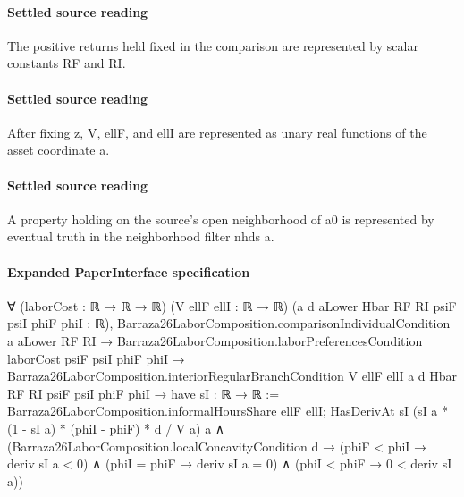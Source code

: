 \documentclass[10pt]{article}
\begin{document}
\paragraph{Settled source reading}
\begin{sloppypar}
The positive returns held fixed in the comparison are represented by scalar constants RF and RI.\allowbreak{}
\end{sloppypar}
\paragraph{Settled source reading}
\begin{sloppypar}
After fixing z, V, ellF, and ellI are represented as unary real functions of the asset coordinate a.\allowbreak{}
\end{sloppypar}
\paragraph{Settled source reading}
\begin{sloppypar}
A property holding on the source's open neighborhood of a0 is represented by eventual truth in the neighborhood filter nhds a.\allowbreak{}
\end{sloppypar}

\paragraph{Expanded PaperInterface specification}
\begin{ReviewVerbatim}
∀ (laborCost : ℝ → ℝ → ℝ) (V ellF ellI : ℝ → ℝ) (a d aLower Hbar RF RI psiF psiI phiF phiI : ℝ),
  Barraza26LaborComposition.comparisonIndividualCondition a aLower RF RI →
    Barraza26LaborComposition.laborPreferencesCondition laborCost psiF psiI phiF phiI →
      Barraza26LaborComposition.interiorRegularBranchCondition V ellF ellI a d Hbar RF RI psiF psiI phiF phiI →
        have sI : ℝ → ℝ := Barraza26LaborComposition.informalHoursShare ellF ellI;
        HasDerivAt sI (sI a * (1 - sI a) * (phiI - phiF) * d / V a) a ∧
          (Barraza26LaborComposition.localConcavityCondition d →
            (phiF < phiI → deriv sI a < 0) ∧ (phiI = phiF → deriv sI a = 0) ∧ (phiI < phiF → 0 < deriv sI a))
\end{ReviewVerbatim}
\end{document}
